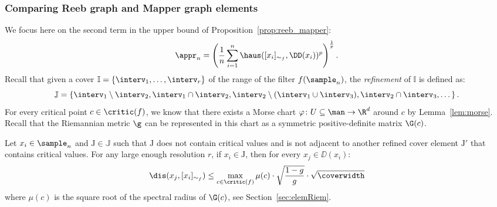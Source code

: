  \subsubsection{Comparing Reeb graph and Mapper graph elements}
We focus here on the second term in the upper bound of Proposition~\ref{prop:reeb_mapper}:
$$\appr_n=\left(\frac{1}{n}\sum_{i=1}^n\haus([x_i]_{\sim_f},\DD(x_i))^p\right)^{\frac{1}{p}}.$$
Recall that given a cover $\mathbb{I}=\{\interv_1,\dots,\interv_r\}$ of the range of the filter $f(\sample_n)$, the {\em refinement} of $\mathbb{I}$ is defined as:
$$\mathbb{J}=\left\{\interv_1\setminus\interv_2,\interv_1\cap\interv_2,\interv_2\setminus(\interv_1\cup\interv_3),\interv_2\cap\interv_3,\dots\right\}.$$
For every critical point $c\in\critic(f)$, we know that there exists a Morse chart $\varphi\colon U\subseteq\man\rightarrow\R^d$ around $c$ by Lemma~\ref{lem:morse}. Recall that the Riemannian metric $\g$ can be represented in this chart as a symmetric positive-definite matrix $\G(c)$.

\begin{lemma}\label{lem:delta}
Let $x_i\in\sample_n$ and $\mathrm{J}\in\mathbb{J}$ such that $\mathrm{J}$ does not contain critical values and is not adjacent to another refined cover element $\mathrm{J}'$ that contains critical values. For any large enough resolution $r$, if $x_i\in\mathrm{J}$, then for every $x_j\in\DD(x_i)$:
$$\dis(x_j,[x_i]_{\sim_f})\leq\max_{c\in\critic(f)}\mu(c)\cdot\sqrt{\frac{1-g}{g}}\cdot\sqrt{\coverwidth}$$
where $\mu(c)$ is the square root of the spectral radius of $\G(c)$, see Section~\ref{sec:elemRiem}.
\end{lemma}

